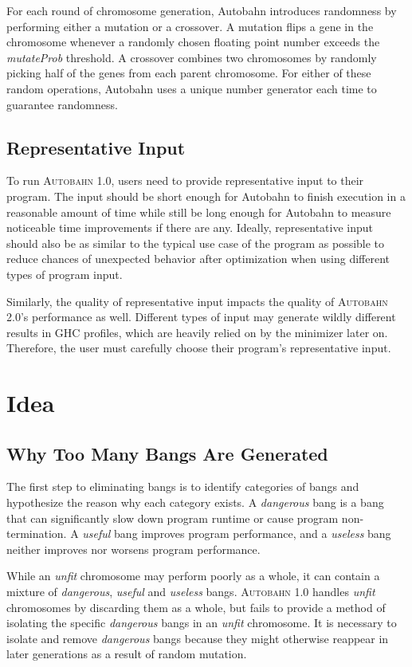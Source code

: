 \documentclass[format=sigplan]{acmart}
\newcommand{\unfit}[0]{\textit{unfit}}
\newcommand{\dangerous}[0]{\textit{dangerous}}
\newcommand{\useful}[0]{\textit{useful}}
\newcommand{\useless}[0]{\textit{useless}}
\newcommand{\Ao}[0]{\textsc{Autobahn 1.0}}
\newcommand{\At}[0]{\textsc{Autobahn 2.0}}
\begin{document}
For each round of chromosome generation, Autobahn introduces randomness by performing either a mutation or a crossover. A mutation flips a gene in the chromosome whenever a randomly chosen floating point number exceeds the \textit{mutateProb} threshold. A crossover combines two chromosomes by randomly picking half of the genes from each parent chromosome. For either of these random operations, Autobahn uses a unique number generator each time to guarantee randomness. 

\subsection{Representative Input}

To run \Ao{}, users need to provide representative input to their program. The input should be short enough for Autobahn to finish execution in a reasonable amount of time while still be long enough for Autobahn to measure noticeable time improvements if there are any. Ideally, representative input should also be as similar to the typical use case of the program as possible to reduce chances of unexpected behavior after optimization when using different types of program input.

Similarly, the quality of representative input impacts the quality of \At{}'s performance as well. Different types of input may generate wildly different results in GHC profiles, which are heavily relied on by the minimizer later on. Therefore, the user must carefully choose their program's representative input.

\section{Idea}
\subsection{Why Too Many Bangs Are Generated}

The first step to eliminating bangs is to identify categories of bangs and hypothesize the reason why each category exists. A \dangerous{} bang is a bang that can significantly slow down program runtime or cause program non-termination. A \useful{} bang improves program performance, and a \useless{} bang neither improves nor worsens program performance. 

While an \unfit{} chromosome may perform poorly as a whole, it can contain a mixture of \dangerous, \useful{} and \useless{} bangs. \Ao{} handles \unfit{} chromosomes by discarding them as a whole, but fails to provide a method of isolating the specific \dangerous{} bangs in an \unfit{} chromosome. It is necessary to isolate and remove \dangerous{} bangs because they might otherwise reappear in later generations as a result of random mutation. 
\end{document}
